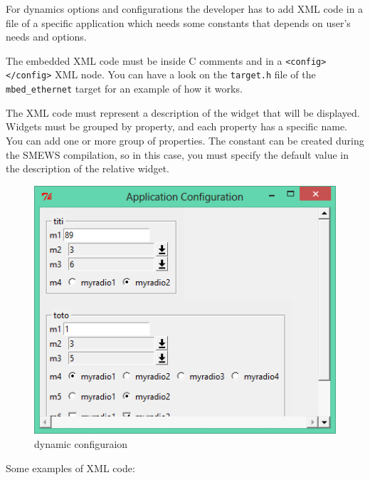 \documentclass{report}
\begin{document}
For dynamics options and configurations the developer has to add XML code in a
file of a specific application which needs some constants that depends on
user’s needs and options. 

The embedded XML code must be inside C comments and in a
\verb!<config> </config>! XML node. You can have a look on the \verb!target.h!
file of the \verb!mbed_ethernet! target for an example of how it works.

The XML code must represent a description of the widget that will be
displayed. Widgets must be grouped by property, and each property has a
specific name. You can add one or more group of properties.  The constant can
be created during the SMEWS compilation, so in this case, you must specify the
default value in the description of the relative widget.
\begin{figure}[H]
\centering
\includegraphics[scale=0.9]{Appsconfig}
\caption{dynamic configuraion}
\end{figure}
Some examples of XML code:
\end{document}
